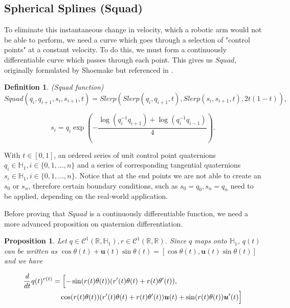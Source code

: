 \documentclass[a4paper, 11pt]{article}
\newtheorem{definition}{Definition}
\newtheorem{proposition}{Proposition}
\begin{document}
\subsection{Spherical Splines (Squad)}

To eliminate this instantaneous change in velocity, which a robotic arm would not be able to perform, we need a curve which goes through a selection of "control points" at a constant velocity. To do this, we must form a continuously differentiable curve which passes through each point. This gives us $Squad$, originally formulated by Shoemake but referenced in \citet[p.~51]{dam_koch_lillholm_1998}.

\begin{definition}(Squad function)
\[Squad(q_i,q_{i+1},s_i,s_{i+1},t) = Slerp(Slerp(q_i,q_{i+1},t),Slerp(s_i,s_{i+1} ,t),2t(1-t)),\]

\[s_i = q_i \exp \left( -\frac{\log (q_i^{-1}q_{i+1}) + \log (q_i^{-1}q_{i-1})}{4} \right).\]

\end{definition}

With $t\in [0,1]$, an ordered series of unit control point quaternions $q_i \in \mathbb{H}_1 , i \in \{0,1, \dots , n \}$ and a 
series of corresponding tangential quaternions $s_i\in \mathbb{H}_1,  i \in \{0,1, \dots , n \} $. Notice that at the end points we are not able to create an $s_0$ or $s_n$, therefore certain boundary conditions, such as $s_0 = q_0, s_n =q_n$ need to be applied, depending on the real-world application.

Before proving that $Squad$ is a continuously differentiable function, we need a more advanced proposition on quaternion differentiation. 

\begin{proposition}

Let $q \in \mathcal{C}^1(\mathbb{R}, \mathbb{H}_1), r \in \mathcal{C}^1(\mathbb{R}, \mathbb{R})$. Since $q$ maps onto $\mathbb{H}_1$, $q(t)$ can be written as $\cos \theta(t) +  \boldsymbol{u}(t)\sin \theta (t) = \left[ \cos \theta(t),  \boldsymbol{u}(t)\sin \theta (t) \right]$ and we have

\begin{align*}
\frac{d}{d t} q(t)^{r(t)} &= \Bigl[ -\sin(r(t)\theta(t)) (r'(t)\theta(t) + r(t)\theta'(t)), \\
    &\quad \cos(r(t)\theta(t)) (r'(t)\theta(t) + r(t)\theta'(t)) \boldsymbol{u}(t) + \sin(r(t)\theta(t)) \boldsymbol{u}'(t) \Bigr]
\end{align*}

\citep[pp.~24--25]{dam_koch_lillholm_1998}

\end{proposition}
\end{document}
